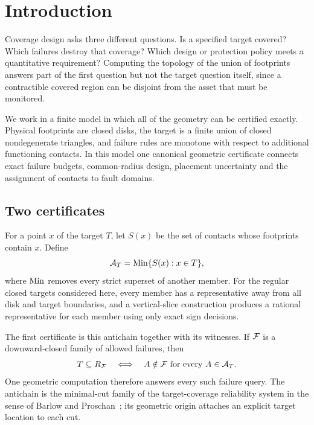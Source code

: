 \section{Introduction}
Coverage design asks three different questions. Is a specified target covered? Which failures destroy that coverage? Which design or protection policy meets a quantitative requirement? Computing the topology of the union of footprints answers part of the first question but not the target question itself, since a contractible covered region can be disjoint from the asset that must be monitored.

We work in a finite model in which all of the geometry can be certified exactly. Physical footprints are closed disks, the target is a finite union of closed nondegenerate triangles, and failure rules are monotone with respect to additional functioning contacts. In this model one canonical geometric certificate connects exact failure budgets, common-radius design, placement uncertainty and the assignment of contacts to fault domains.

\subsection{Two certificates}
For a point $x$ of the target $T$, let $S(x)$ be the set of contacts whose footprints contain $x$. Define
\begin{equation}\label{eq:overview-antichain}
\mathcal A_T=\operatorname{Min}\{S(x):x\in T\},
\end{equation}
where $\operatorname{Min}$ removes every strict superset of another member. For the regular closed targets considered here, every member has a representative away from all disk and target boundaries, and a vertical-slice construction produces a rational representative for each member using only exact sign decisions.

The first certificate is this antichain together with its witnesses. If $\mathcal F$ is a downward-closed family of allowed failures, then
\begin{equation}\label{eq:overview-universal}
T\subseteq R_{\mathcal F}\quad\Longleftrightarrow\quad
A\notin\mathcal F\text{ for every }A\in\mathcal A_T.
\end{equation}
One geometric computation therefore answers every such failure query. The antichain is the minimal-cut family of the target-coverage reliability system in the sense of Barlow and Proschan~\cite{barlow}; its geometric origin attaches an explicit target location to each cut.

